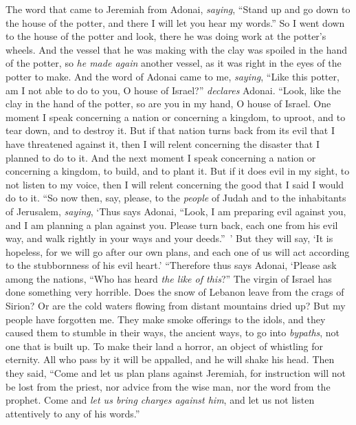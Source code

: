 \begin{biblechapter} %
 The word that came to Jeremiah from Adonai, \textit{saying},
\verse “Stand up and go down to the house of the potter, and there I will let you hear my words.”
\verse So I went down to the house of the potter and look, there he was doing work at the potter’s wheels.
\verse And the vessel that he was making with the clay was spoiled in the hand of the potter, so \textit{he made again} another vessel, as it was right in the eyes of the potter to make.
\verse And the word of Adonai came to me, \textit{saying},
\verse “Like this potter, am I not able to do to you, O house of Israel?” \textit{declares} Adonai. “Look, like the clay in the hand of the potter, so are you in my hand, O house of Israel.
\verse One moment I speak concerning a nation or concerning a kingdom, to uproot, and to tear down, and to destroy it.
\verse But if that nation turns back from its evil that I have threatened against it, then I will relent concerning the disaster that I planned to do to it.
\verse And the next moment I speak concerning a nation or concerning a kingdom, to build, and to plant it.
\verse But if it does evil in my sight, to not listen to my voice, then I will relent concerning the good that I said I would do to it.
\verse “So now then, say, please, to the \textit{people} of Judah and to the inhabitants of Jerusalem, \textit{saying}, ‘Thus says Adonai, “Look, I am preparing evil against you, and I am planning a plan against you. Please turn back, each one from his evil way, and walk rightly in your ways and your deeds.” ’
\verse But they will say, ‘It is hopeless, for we will go after our own plans, and each one of us will act according to the stubbornness of his evil heart.’
\verse “Therefore thus says Adonai,
\verse ‘Please ask among the nations, “Who has heard \textit{the like of this}?” 
The virgin of Israel has done something very horrible.
\verse Does the snow of Lebanon leave from the crags of Sirion? 
Or are the cold waters flowing from distant mountains dried up?
\verse But my people have forgotten me. 
They make smoke offerings to the idols, 
and they caused them to stumble in their ways, the ancient ways, 
to go into \textit{bypaths}, not one that is built up.
\verse To make their land a horror, 
an object of whistling for eternity. 
All who pass by it will be appalled, 
and he will shake his head.
 Then they said, “Come and let us plan plans against Jeremiah, for instruction will not be lost from the priest, nor advice from the wise man, nor the word from the prophet. Come and \textit{let us bring charges against him}, and let us not listen attentively to any of his words.”

\end{biblechapter}
